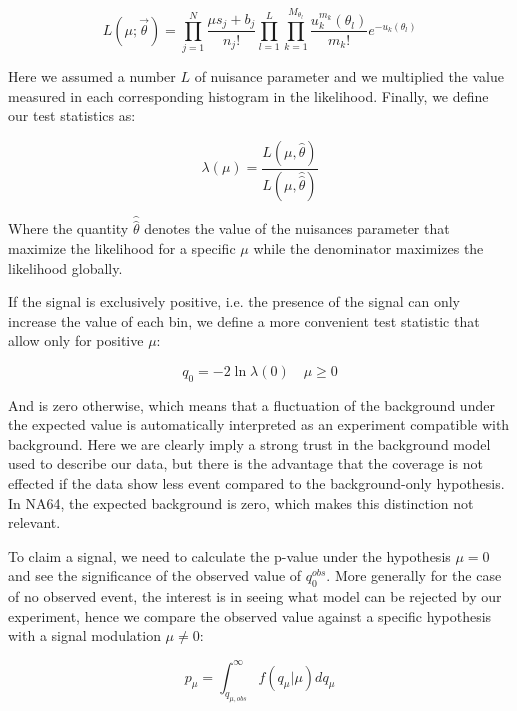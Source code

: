 \begin{equation}
  \label{eq:likelihood}
  L(\mu; \vec{\theta}) = \prod_{j=1}^N \frac{\mu s_j + b_j}{n_j!} \prod_{l=1}^{L}\prod_{k=1}^{M_{\theta_l}}\frac{u^{m_k}_k(\theta_l)}{m_k!} e^{-u_k(\theta_l)}
\end{equation}

Here we assumed a number $L$ of nuisance parameter and we multiplied the value measured in each corresponding histogram in the likelihood. Finally, we define our test statistics as:

\begin{equation}
  \label{eq:profile-likelihood}
  \lambda(\mu) = \frac{L(\mu,\hat{\theta})}{L(\mu,\hat{\hat{\theta}})}
\end{equation}

Where the quantity $\hat{\hat{\theta}}$ denotes the value of the nuisances parameter that maximize the likelihood for a specific $\mu$ while the denominator maximizes the likelihood globally.

If the signal is exclusively positive, i.e. the presence of the signal can only increase the value of each bin, we define a more convenient test statistic that allow only for positive $\mu$:

\begin{equation}
  \label{eq:profile-q}
  q_0 = -2\ln{\lambda(0)} \quad \mu \geq 0
\end{equation}

And is zero otherwise, which means that a fluctuation of the background under the expected value is automatically interpreted as an experiment compatible with background. Here we are clearly imply a strong trust in the background model used to describe our data, but there is the advantage that the coverage is not effected if the data show less event compared to the background-only hypothesis. In NA64, the expected background is zero, which makes this distinction not relevant.

To claim a signal, we need to calculate the p-value under the hypothesis $\mu = 0$ and see the significance of the observed value of $q^{obs}_0$. More generally for the case of no observed event, the interest is in seeing what model can be rejected by our experiment, hence we compare the observed value against a specific hypothesis with a signal modulation $\mu \neq 0$:

\begin{equation}
  \label{eq:p-value-q}
  p_{\mu} = \int_{q_{\mu, obs}}^{\infty} f(q_{\mu}|\mu) dq_{\mu}
\end{equation}

